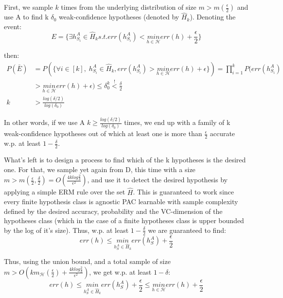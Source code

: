 First, we sample $k$ times from the underlying distribution of size $m>m(\frac{\epsilon}{2})$ and use A to find k $\delta_0$ weak-confidence hypotheses (denoted by $\hat{H}_k$). Denoting the event:
\begin{equation*}
    E = \{\exists h_{S_i}^A \in \hat{H}_k s.t. err(h_{S_i}^A) < \underset{h\in \mathcal{H}}{min} err(h) + \frac{\epsilon}{2}\}
\end{equation*}

then:
\begin{equation*}
    \begin{split}
        P(\bar{E}) &= P(\{\forall i\in [k], \; h_{S_i}^A \in \hat{H}_k,  err(h_{S_i}^A) > \underset{h\in \mathcal{H}}{min} err(h) + \epsilon \}) = \prod_{i=1}^k P(err(h_{S_i}^A) \\
        &> \underset{h\in \mathcal{H}}{min} err(h) + \epsilon ) \leq \delta_0^k \overset{!}{<} \frac{\delta}{2} \\
        k &> \frac{log(\delta/2)}{log(\delta_0)}
    \end{split}
\end{equation*}

In other words, if we use A $k \geq \frac{log(\delta/2)}{log(\delta_0)}$ times, we end up with a family of k weak-confidence hypotheses out of which at least one is more than $\frac{\epsilon}{2}$ accurate w.p. at least $1-\frac{\delta}{2}$.

What's left is to design a process to find which of the k hypotheses is the desired one. For that, we sample yet again from D, this time with a size $m > m(\frac{\epsilon}{2}, \frac{\delta}{2}) = O\left(\frac{4k log\frac{2}{\delta}}{\epsilon^2}\right)$, and use it to detect the desired hypothesis by applying a simple ERM rule over the set $\hat{H}$. This is guaranteed to work since every finite hypothesis class is agnostic PAC learnable with sample complexity defined by the desired accuracy, probability and the VC-dimension of the hypotheses class (which in the case of a finite hypotheses class is upper bounded by the log of it's size). Thus, w.p. at least $1-\frac{\delta}{2}$ we are guaranteed to find:
\begin{equation*}
    err(h) \leq \underset{h_S^A \in \hat{H}_k}{min} err(h_S^A) + \frac{\epsilon}{2}
\end{equation*}

Thus, using the union bound, and a total sample of size $m > O(km_\mathcal{H}(\frac{\epsilon}{2}) + \frac{4k log\frac{2}{\delta}}{\epsilon^2})$, we get w.p. at least $1-\delta$:
\begin{equation*}
    err(h) \leq \underset{h_S^A \in \hat{H}_k}{min} err(h_S^A) + \frac{\epsilon}{2} \leq \underset{h\in \mathcal{H}}{min} err(h) + \frac{\epsilon}{2}
\end{equation*}
